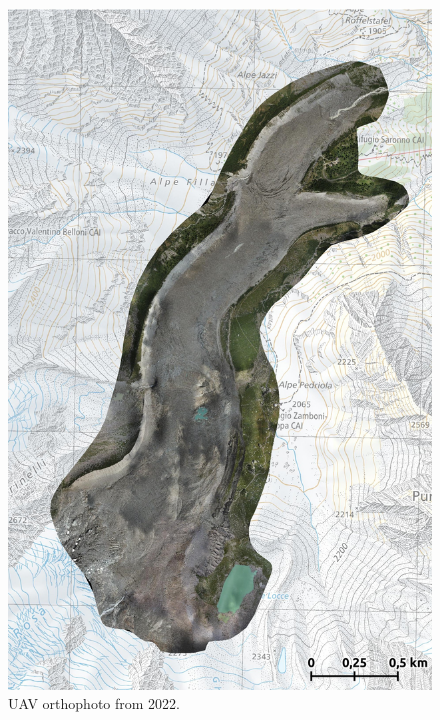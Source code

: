 \begin{figure}[p]
    \centering
    \includegraphics[height=\textheight]{figures/appendix/orto_2022.jpg}
    \caption[]{UAV orthophoto from 2022.}
\end{figure}

